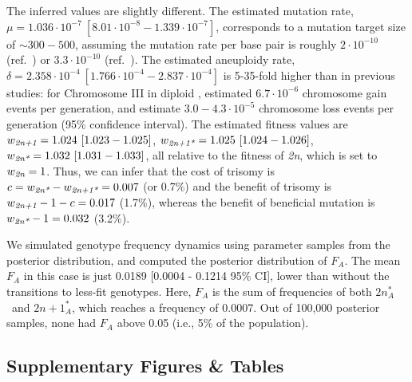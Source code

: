 \documentclass[12pt]{extarticle}
\newcommand{\euwt}{\emph{2n}}
\newcommand{\anwt}{\emph{2n+1}}
\newcommand{\eumt}{\emph{2n*}}
\newcommand{\eumtA}{\emph{$2n^*_A$}}
\newcommand{\anmt}{\emph{2n+1*}}
\begin{document}
The inferred values are slightly different.
The estimated mutation rate, $\mu=1.036\cdot10^{-7}\ [8.01\cdot10^{-8}-1.339\cdot10^{-7}]$, corresponds to a mutation target size of $\sim 300-500$, assuming the mutation rate per base pair is roughly $2\cdot10^{-10}$ (ref.~\citep{Zhu2014}) or $3.3\cdot10^{-10}$ (ref.~\citep{Lynch2008}).
The estimated aneuploidy rate, $\delta=2.358\cdot10^{-4}\ [1.766\cdot10^{-4}-2.837\cdot10^{-4}]$ is 5-35-fold higher than in previous studies: for Chromosome III in diploid \yeast, \citet{Zhu2014} estimated $6.7\cdot10^{-6}$ chromosome gain events per generation, and \citet{Kumaran2013} estimate $3.0-4.3\cdot10^{-5}$ chromosome loss events per generation (95\% confidence interval).
The estimated fitness values are 
$w_{\anwt}=1.024\ [1.023-1.025]$,
$w_{\anmt}=1.025\ [1.024-1.026]$,
$w_{\eumt}=1.032\ [1.031-1.033]$, all relative to the fitness of \euwt, which is set to $w_{\euwt}=1$. 
Thus, we can infer that the cost of trisomy is $c = w_{\eumt}-w_{\anmt} = 0.007$ (or 0.7\%) and the benefit of trisomy is $w_{\anwt}-1-c=0.017$ (1.7\%), whereas the benefit of beneficial mutation is $w_{\eumt}-1=0.032$ (3.2\%).

We simulated genotype frequency dynamics using parameter samples from the posterior distribution, and computed the posterior distribution of $F_A$. 
The mean $F_A$ in this case is just 0.0189 [0.0004 - 0.1214 95\% CI], lower than without the transitions to less-fit genotypes. Here, $F_A$ is the sum of frequencies of both \eumtA\ and $2n+1^*_A$, which reaches a frequency of 0.0007. Out of 100,000 posterior samples, none had $F_A$ above 0.05 (i.e., 5\% of the population).


\newpage
\subsection*{Supplementary Figures \& Tables}
\end{document}
